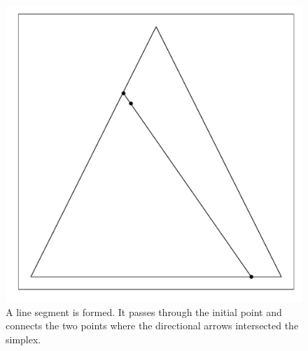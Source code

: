 \documentclass{article}\usepackage{graphicx, color}
\makeatletter
\def\maxwidth{ %
  \ifdim\Gin@nat@width>\linewidth
    \linewidth
  \else
    \Gin@nat@width
  \fi
}
\newenvironment{knitrout}{}{} %
\makeatother
\begin{document}
\begin{figure}[H]
\begin{knitrout}
\color{fgcolor}
\includegraphics[width=\maxwidth]{figure/hitandrun_walkthrough5} 

\end{knitrout}

\caption{A line segment is formed. It passes through the initial point and connects the two points where the directional arrows intersected the simplex.}
\end{figure}
\end{document}
